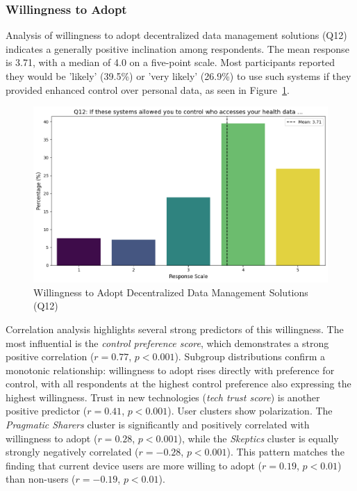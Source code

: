 	\subsubsection{Willingness to Adopt}
	Analysis of willingness to adopt decentralized data management solutions (Q12) indicates a generally positive inclination among respondents. The mean response is 3.71, with a median of 4.0 on a five-point scale. Most participants reported they would be 'likely' (39.5\%) or 'very likely' (26.9\%) to use such systems if they provided enhanced control over personal data, as seen in Figure~\ref{fig:Q12_willingness}.
	\begin{figure}[h!]\centering
		\includegraphics[width=1\linewidth]{figures/questions/Q12_likert.png}
		\caption{Willingness to Adopt Decentralized Data Management Solutions (Q12)}
		\label{fig:Q12_willingness}
	\end{figure}
	Correlation analysis highlights several strong predictors of this willingness. The most influential is the \textit{control preference score}, which demonstrates a strong positive correlation ($r = 0.77$, $p < 0.001$). Subgroup distributions confirm a monotonic relationship: willingness to adopt rises directly with preference for control, with all respondents at the highest control preference also expressing the highest willingness. Trust in new technologies (\textit{tech trust score}) is another positive predictor ($r = 0.41$, $p < 0.001$).
	User clusters show polarization. The \textit{Pragmatic Sharers} cluster is significantly and positively correlated with willingness to adopt ($r = 0.28$, $p < 0.001$), while the \textit{Skeptics} cluster is equally strongly negatively correlated ($r = -0.28$, $p < 0.001$). This pattern matches the finding that current device users are more willing to adopt ($r = 0.19$, $p < 0.01$) than non-users ($r = -0.19$, $p < 0.01$).
